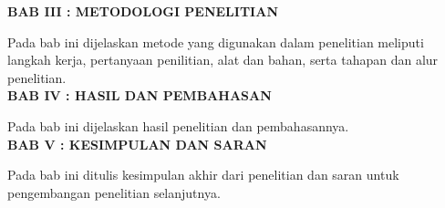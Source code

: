\noindent
\textbf{BAB III : METODOLOGI PENELITIAN}

Pada bab ini dijelaskan metode yang digunakan dalam penelitian meliputi langkah kerja, pertanyaan penilitian, alat dan bahan, serta tahapan dan alur penelitian.\\

\noindent
\textbf{BAB IV : HASIL DAN PEMBAHASAN}

Pada bab ini dijelaskan hasil penelitian dan pembahasannya.\\

\noindent
\textbf{BAB V : KESIMPULAN DAN SARAN}

Pada bab ini ditulis kesimpulan akhir dari penelitian dan saran untuk pengembangan penelitian selanjutnya.\\

\begin{comment}

\end{comment}
